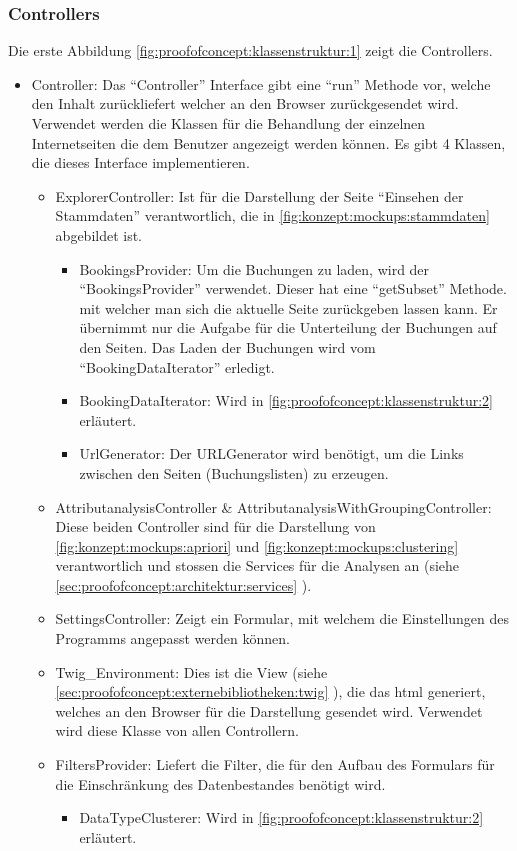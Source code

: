 \subsubsection{Controllers}
\label{sec:proofofconcept:klassenstruktur:controllers}
Die erste Abbildung \cref{fig:proofofconcept:klassenstruktur:1} zeigt die Controllers. 
\begin{itemize}
	 \item Controller: Das "`Controller"' Interface gibt eine "`run"' Methode vor, welche den Inhalt zurückliefert welcher an den Browser zurückgesendet wird. Verwendet werden die Klassen für die Behandlung der einzelnen Internetseiten die dem Benutzer angezeigt werden können. Es gibt 4 Klassen, die dieses Interface implementieren.
	 \begin{itemize}
		\item ExplorerController: Ist für die Darstellung der Seite "`Einsehen der Stammdaten"' verantwortlich, die in \cref{fig:konzept:mockups:stammdaten} abgebildet ist.
			\begin{itemize}
				\item BookingsProvider: Um die Buchungen zu laden, wird der "`BookingsProvider"' verwendet. Dieser hat eine "`getSubset"' Methode. mit welcher man sich die aktuelle Seite zurückgeben lassen kann. Er übernimmt nur die Aufgabe für die Unterteilung der Buchungen auf den Seiten. Das Laden der Buchungen wird vom "`BookingDataIterator"' erledigt.
				\item BookingDataIterator: Wird in \cref{fig:proofofconcept:klassenstruktur:2} erläutert.
				\item UrlGenerator: Der URLGenerator wird benötigt, um die Links zwischen den Seiten (Buchungslisten) zu erzeugen.
			\end{itemize}
		\item AttributanalysisController \& AttributanalysisWithGroupingController: Diese beiden Controller sind für die Darstellung von \cref{fig:konzept:mockups:apriori} und \cref{fig:konzept:mockups:clustering} verantwortlich und stossen die Services für die Analysen an (siehe \cref{sec:proofofconcept:architektur:services} ). 
		\item SettingsController: Zeigt ein Formular, mit welchem die Einstellungen des Programms angepasst werden können.
		\item Twig\_Environment: Dies ist die View (siehe \cref{sec:proofofconcept:externebibliotheken:twig} ), die das \gls{html} generiert, welches an den Browser für die Darstellung gesendet wird. Verwendet wird diese Klasse von allen Controllern.
		\item FiltersProvider: Liefert die Filter, die für den Aufbau des Formulars für die Einschränkung des Datenbestandes benötigt wird.
			\begin{itemize}
				\item DataTypeClusterer: Wird in \cref{fig:proofofconcept:klassenstruktur:2} erläutert.
			\end{itemize}
	 \end{itemize}
\end{itemize}

